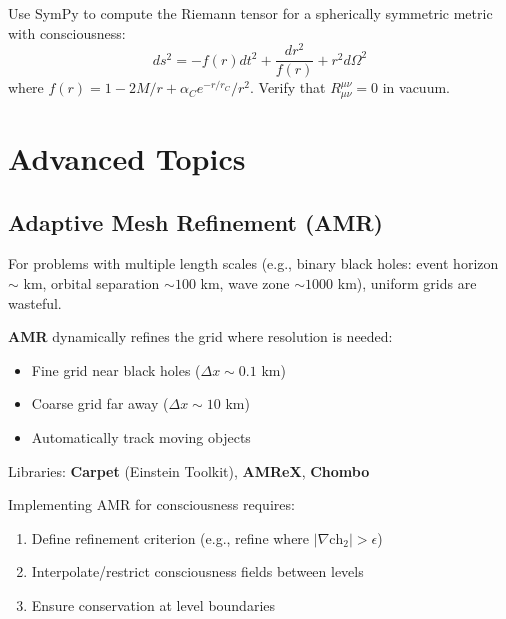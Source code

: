 \begin{exercise}
Use SymPy to compute the Riemann tensor for a spherically symmetric metric with consciousness:
\begin{equation}
ds^2 = -f(r) dt^2 + \frac{dr^2}{f(r)} + r^2 d\Omega^2
\end{equation}
where $f(r) = 1 - 2M/r + \alpha_C e^{-r/r_C}/r^2$. Verify that $R^{\mu\nu}_{\mu\nu} = 0$ in vacuum.
\end{exercise}

\section{Advanced Topics}

\begin{advanced}
\subsection{Adaptive Mesh Refinement (AMR)}

For problems with multiple length scales (e.g., binary black holes: event horizon $\sim$ km, orbital separation $\sim 100$ km, wave zone $\sim 1000$ km), uniform grids are wasteful.

\textbf{AMR} dynamically refines the grid where resolution is needed:
\begin{itemize}
\item Fine grid near black holes ($\Delta x \sim 0.1$ km)
\item Coarse grid far away ($\Delta x \sim 10$ km)
\item Automatically track moving objects
\end{itemize}

Libraries: \textbf{Carpet} (Einstein Toolkit), \textbf{AMReX}, \textbf{Chombo}

Implementing AMR for consciousness requires:
\begin{enumerate}
\item Define refinement criterion (e.g., refine where $|\nabla \text{ch}_2| > \epsilon$)
\item Interpolate/restrict consciousness fields between levels
\item Ensure conservation at level boundaries
\end{enumerate}
\end{advanced}

